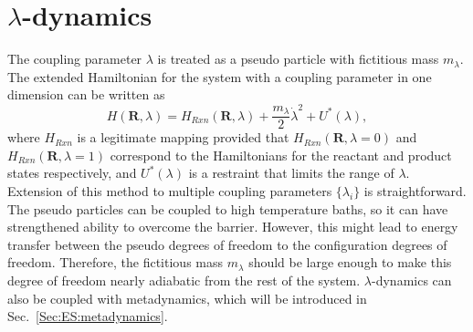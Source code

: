 \section{\texorpdfstring{$\lambda$-dynamics}{λ-dynamics}\label{Sec:ES:lambdadynamics}}
The coupling parameter $\lambda$ is treated as a pseudo particle with fictitious mass $m_\lambda$.
\vspace{10pt}
The extended Hamiltonian for the system with a coupling parameter in one dimension can be written as
\begin{equation}
	H(\mathbf{R},\lambda)=H_{Rxn}(\mathbf{R},\lambda) + \frac{m_\lambda}{2}{\dot{\lambda}}^2+U^{*}(\lambda),
\end{equation}
where $H_{Rxn}$ is a legitimate mapping provided that $H_{Rxn}(\mathbf{R},\lambda=0)$ and $H_{Rxn}(\mathbf{R},\lambda=1)$ correspond to the Hamiltonians for the reactant and product states respectively, and $U^{*}(\lambda)$ is a restraint that limits the range of $\lambda$. Extension of this method to multiple coupling parameters $\{\lambda_i\}$ is straightforward. The pseudo particles can be coupled to high temperature baths, so it can have strengthened ability to overcome the barrier. However, this might lead to energy transfer between the pseudo degrees of freedom to the configuration degrees of freedom. Therefore, the fictitious mass $m_\lambda$ should be large enough to make this degree of freedom nearly adiabatic from the rest of the system.\cite{AbramsJCP2006} $\lambda$-dynamics can also be coupled with metadynamics,\cite{WuJPCL2011} which will be introduced in Sec.~\ref{Sec:ES:metadynamics}.